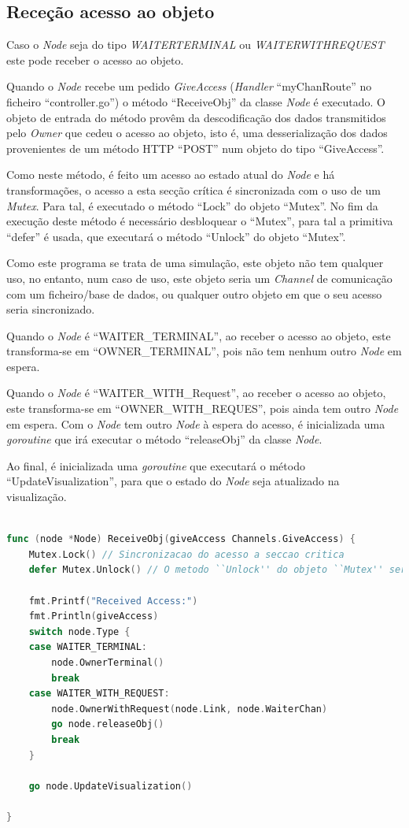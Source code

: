 \subsection{Receção acesso ao objeto}
Caso o \emph{Node} seja do tipo \emph{WAITER\textunderscore TERMINAL} ou \emph{WAITER\textunderscore WITH\textunderscore REQUEST}
este pode receber o acesso ao objeto.

Quando o \emph{Node} recebe um pedido \emph{GiveAccess} (\emph{Handler} ``myChanRoute'' no ficheiro ``controller.go'') o
método ``ReceiveObj'' da classe \emph{Node} é executado.
O objeto de entrada do método provêm da descodificação dos dados transmitidos pelo \emph{Owner}
que cedeu o acesso ao objeto, isto é, uma desserialização dos dados provenientes de um método \acs{HTTP} ``POST''
num objeto do tipo ``GiveAccess''.


Como neste método, é feito um acesso ao estado atual do \emph{Node} e há transformações, 
o acesso a esta secção crítica é sincronizada com o uso de um \emph{Mutex}.
Para tal, é executado o método ``Lock'' do objeto ``Mutex''.
No fim da execução deste método é necessário desbloquear o ``Mutex'', para tal 
a primitiva ``defer'' é usada, que executará o método ``Unlock'' do objeto ``Mutex''.

Como este programa se trata de uma simulação, este objeto não tem qualquer uso,
no entanto, num caso de uso,
este objeto seria um \emph{Channel} de comunicação com um ficheiro/base de dados, ou qualquer outro
objeto em que o seu acesso seria sincronizado.


Quando o \emph{Node} é ``WAITER\_TERMINAL'', ao receber o acesso ao objeto,
este transforma-se em ``OWNER\_TERMINAL'', pois não tem nenhum outro \emph{Node} em espera.


Quando o \emph{Node} é ``WAITER\_WITH\_Request'', ao receber o acesso ao objeto,
este transforma-se em ``OWNER\_WITH\_REQUES'', pois ainda tem outro \emph{Node} em espera.
Com o \emph{Node} tem outro \emph{Node} à espera do acesso, é inicializada uma \emph{goroutine}
que irá executar o método ``releaseObj'' da classe \emph{Node}.


Ao final, é inicializada uma \emph{goroutine} que executará 
o método ``UpdateVisualization'', para que o estado do \emph{Node}
seja atualizado na visualização.


\begin{lstlisting}[caption={Método ``AutoRequest''},language=Go]

func (node *Node) ReceiveObj(giveAccess Channels.GiveAccess) {
	Mutex.Lock() // Sincronizacao do acesso a seccao critica
	defer Mutex.Unlock() // O metodo ``Unlock'' do objeto ``Mutex'' sera executado caso o metodo ``Request'' termine

	fmt.Printf("Received Access:")
	fmt.Println(giveAccess)
	switch node.Type {
	case WAITER_TERMINAL:
		node.OwnerTerminal()
		break
	case WAITER_WITH_REQUEST:
		node.OwnerWithRequest(node.Link, node.WaiterChan)
		go node.releaseObj()
		break
	}

	go node.UpdateVisualization()

}

\end{lstlisting}

